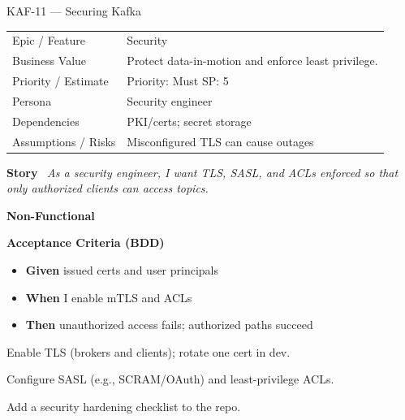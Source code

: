 \documentclass[11pt,a4paper]{article}
\newcommand{\Field}[2]{\textbf{#1}~#2}
\begin{document}
\begin{StoryCardBox}{KAF-11 --- Securing Kafka}
\begin{tabularx}{\linewidth}{LY}
 Epic / Feature & Security \\
 Business Value & Protect data-in-motion and enforce least privilege. \\
 Priority / Estimate & Priority: Must \quad SP: 5 \\
 Persona & Security engineer \\
 Dependencies & PKI/certs; secret storage \\
 Assumptions / Risks & Misconfigured TLS can cause outages \\
\end{tabularx}

\medskip
\Field{Story}{\; \emph{As a security engineer, I want TLS, SASL, and ACLs enforced so that only authorized clients can access topics.}}

\medskip
\Field{Non-Functional}{\; \; }

\medskip
\Field{Acceptance Criteria (BDD)}{}
\begin{itemize}[leftmargin=1.2em, itemsep=1pt]
  \item \textbf{Given} issued certs and user principals
  \item \textbf{When} I enable mTLS and ACLs
  \item \textbf{Then} unauthorized access fails; authorized paths succeed
\end{itemize}

\begin{TasksBox}
\begin{tasklist}
  \item Enable TLS (brokers and clients); rotate one cert in dev.
  \item Configure SASL (e.g., SCRAM/OAuth) and least-privilege ACLs.
  \item Add a security hardening checklist to the repo.
\end{tasklist}
\end{TasksBox}
\end{StoryCardBox}
\clearpage
\end{document}
